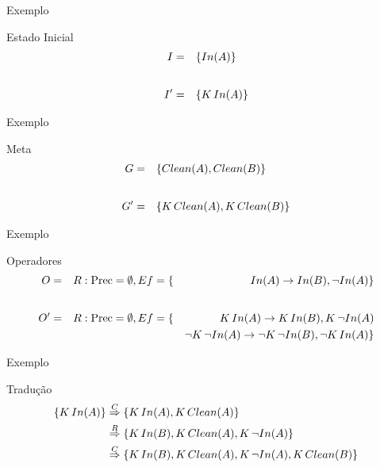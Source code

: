 \begin{frame}{Exemplo}
     \begin{block}{Estado Inicial}
        \begin{align*}
                I = \quad  & \{ In(A)\} \\\intertext{}
                I' = \quad  & \{ K\, In(A) \} \\
        \end{align*}
    \end{block}    
\end{frame}

\begin{frame}{Exemplo}
     \begin{block}{Meta}
        \begin{align*}
                G = \quad  & \{ Clean(A),Clean(B)  \} \\\intertext{}
                G' = \quad  & \{ K\, Clean(A),K\, Clean(B)  \} \\
        \end{align*}
    \end{block}    
\end{frame}

\begin{frame}{Exemplo}
     \begin{block}{Operadores}
        \begin{align*}
                O  = \quad & R: \text{Prec} = \emptyset, Ef= \{& In(A) \rightarrow In(B),\lnot In(A) \} \\ \intertext{}
                O' = \quad & R: \text{Prec} = \emptyset, Ef= \{& K\, In(A) \rightarrow K\, In(B), K\, \lnot In(A)  \\
                          &                                    &\lnot K\,\lnot In(A) \rightarrow \lnot K\,\lnot In(B), \lnot K\, In(A) \} \\
        \end{align*}
    \end{block}    
\end{frame}

\begin{frame}{Exemplo}
    \begin{block}{Tradução}
        \begin{align*}
            \{ K\, In(A)  \} & \overset{C}{\Rightarrow} \{ K\, In(A), K\, Clean(A) \} \\
                            & \overset{R}{\Rightarrow} \{ K\, In(B), K\, Clean(A), K\, \lnot In(A) \} \\
                            & \overset{C}{\Rightarrow} \{ K\, In(B), K\, Clean(A), K\, \lnot In(A), K\, Clean(B) \} 
        \end{align*}
\end{block}
    
    
\end{frame}

